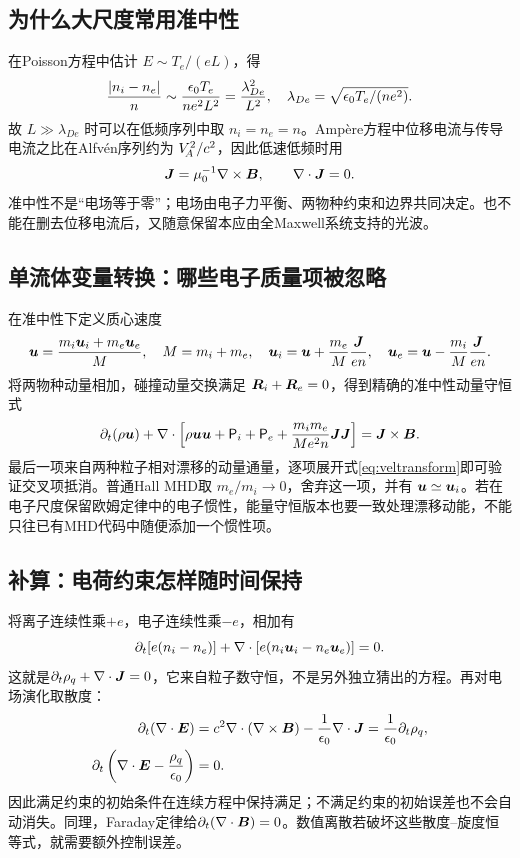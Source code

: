 \documentclass[UTF8,a4paper,11pt,openany,fontset=fandol]{ctexbook}
\begin{document}
\subsection{为什么大尺度常用准中性}
在Poisson方程中估计 $E\sim T_e/(eL)$，得
\begin{equation}{|n_i-n_e|\over n}\sim{\epsilon_0T_e\over ne^2L^2}
={\lambda_{De}^2\over L^2},\quad\lambda_{De}=\sqrt{\epsilon_0T_e/(ne^2)}.
\end{equation}
故 $L\gg\lambda_{De}$ 时可以在低频序列中取 $n_i=n_e=n$。Ampère方程中位移电流与传导电流之比在Alfvén序列约为 $V_{\!A}^2/c^2$，因此低速低频时用
\begin{equation}\bm{J}=\mu_0^{-1}\nabla\times\bm{B},\qquad\nabla\cdot\bm{J}=0.\label{eq:ampere}\end{equation}
准中性不是“电场等于零”；电场由电子力平衡、两物种约束和边界共同决定。也不能在删去位移电流后，又随意保留本应由全Maxwell系统支持的光波。

\subsection{单流体变量转换：哪些电子质量项被忽略}
在准中性下定义质心速度
\begin{equation}\bm{u}={m_i\bm{u}_i+m_e\bm{u}_e\over M},\quad M=m_i+m_e,\quad
\bm{u}_i=\bm{u}+{m_e\over M}{\bm{J}\over en},\quad
\bm{u}_e=\bm{u}-{m_i\over M}{\bm{J}\over en}.\label{eq:veltransform}\end{equation}
将两物种动量相加，碰撞动量交换满足 $\bm{R}_i+\bm{R}_e=0$，得到精确的准中性动量守恒式
\begin{equation}
\partial_t(\rho\bm{u})+\nabla\cdot\left[\rho\bm{u}\bm{u}+\mathsf P_i+\mathsf P_e+
{m_im_e\over M e^2n}\bm{J}\bm{J}\right]=\bm{J}\times\bm{B}.\label{eq:singlemom}
\end{equation}
最后一项来自两种粒子相对漂移的动量通量，逐项展开式\eqref{eq:veltransform}即可验证交叉项抵消。普通Hall MHD取 $m_e/m_i\to0$，舍弃这一项，并有 $\bm{u}\simeq\bm{u}_i$。若在电子尺度保留欧姆定律中的电子惯性，能量守恒版本也要一致处理漂移动能，不能只往已有MHD代码中随便添加一个惯性项。

\subsection{补算：电荷约束怎样随时间保持}
将离子连续性乘$+e$，电子连续性乘$-e$，相加有
\begin{equation}
 \partial_t[e(n_i-n_e)]+\nabla\cdot[e(n_i\bm{u}_i-n_e\bm{u}_e)]=0.
\end{equation}
这就是$\partial_t\rho_q+\nabla\cdot\bm{J}=0$，它来自粒子数守恒，不是另外独立猜出的方程。再对电场演化取散度：
\begin{align}
 \partial_t(\nabla\cdot\bm{E})
 &=c^2\nabla\cdot(\nabla\times\bm{B})-{1\over\epsilon_0}\nabla\cdot\bm{J}
 ={1\over\epsilon_0}\partial_t\rho_q,\\
 \partial_t\left(\nabla\cdot\bm{E}-{\rho_q\over\epsilon_0}\right)&=0.
\end{align}
因此满足约束的初始条件在连续方程中保持满足；不满足约束的初始误差也不会自动消失。同理，Faraday定律给$\partial_t(\nabla\cdot\bm{B})=0$。数值离散若破坏这些散度--旋度恒等式，就需要额外控制误差。
\end{document}
